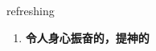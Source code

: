 
\begin{frame}
{\huge refreshing}
\begin{center}
\begin{enumerate}\Large
  \item \textbf{令人身心振奋的，提神的}
\end{enumerate}
\end{center}
\end{frame}
